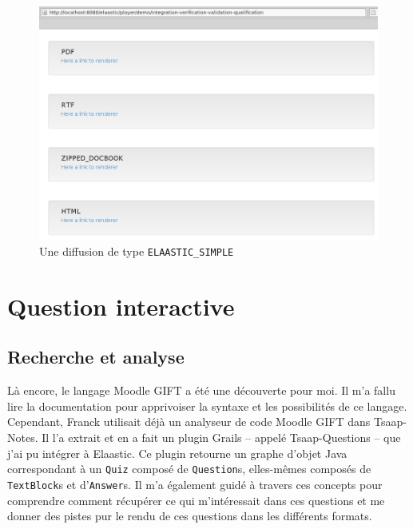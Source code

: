 \begin{figure}[h]
  \centering
  \includegraphics[width=15cm]{images/diffusion.png}
  \caption{Une diffusion de type {\tt ELAASTIC\_SIMPLE}}
  \label{fig:diffusion}
\end{figure}

\section{Question interactive}
\subsection{Recherche et analyse}
Là encore, le langage Moodle GIFT a été une découverte pour moi. Il m'a fallu
lire la documentation pour apprivoiser la syntaxe et les possibilités de ce
langage. Cependant, Franck utilisait déjà un analyseur de code Moodle GIFT dans
Tsaap-Notes. Il l'a extrait et en a fait un plugin Grails -- appelé
Tsaap-Questions -- que j'ai pu intégrer à Elaastic. Ce plugin retourne un graphe
d'objet Java correspondant à un {\tt Quiz} composé de {\tt Question}s,
elles-mêmes composés de {\tt TextBlock}s et d'{\tt Answer}s. Il m'a également
guidé à travers ces concepts pour comprendre comment récupérer ce qui
m'intéressait dans ces questions et me donner des pistes pur le rendu de ces
questions dans les différents formats.\\

